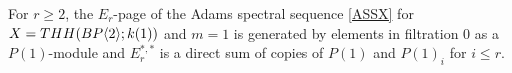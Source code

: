 \begin{comment}
\begin{lem}\label{mod p v_n}
Let $r\ge 2$. Suppose the $E_r(X)$-page of the Adams spectral sequence \eqref{ASSX} is generated by elements in filtration $0$ as a $P(k)$-module and $E_r^{*,*}(X)$ is a direct sum of copies of $P(k)$ and $P(k)_i$ with $i\le r$ as a $P(k)$-module. Then
\begin{enumerate}
\item{} the map of $E_r$-pages
\[ E_r^{s,t}(X) \to v_k^{-1}E_r^{s,t}(X) \]
is a monomorphism when $t\ge r-1\ge 1$. 
\item{} Also, the differentials in $E_{r+1}^{*,*}$ are the same as their image in $v_k^{-1}E_{r+1}^{*,*}$. 
\end{enumerate}
\end{lem}
\begin{proof}
Statement (1) is a consequence of our assumptions since elements in filtration $r-1$ are $v_k$-torsion free. 
To prove statement (2) it suffices to prove the following: if $x\in E_r(X)$ maps to a cycle $\bar{x}\in v_k^{-1}E_r(X)$ ,then $x$ is a cycle. By our assumption, there is an $a\in E_r^{*,0}$ such that $x=v_k^ma$. Statement (1) then implies $d_{r+1}(a)=0$ so since the differentials are $v_k$-linear the result follows. 
\end{proof}
The Lemma above is a generalization of part (a) and (b) of Theorem 7.1 \cite{McClureStaffeldt}, which must have also been known to the authors. %
\end{comment}
\begin{lem} \label{lem mod p v_1}
For $r\ge 2$, the $E_r$-page of the Adams spectral sequence \eqref{ASSX} for $X=THH(BP\langle 2 \rangle;k(1))$ and $m=1$ is generated by elements in filtration $0$ as a $P(1)$-module and $E_{r}^{*,*}$ is a direct sum of copies of $P(1)$ and $P(1)_i$ for $i\le r$. 
\end{lem}
